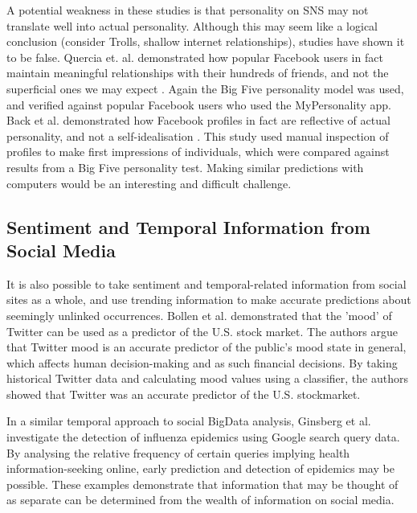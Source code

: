 A potential weakness in these studies is that personality on SNS may not translate well into actual personality. Although this may seem like a logical conclusion (consider Trolls, shallow internet relationships), studies have shown it to be false. Quercia et. al. demonstrated how popular Facebook users in fact maintain meaningful relationships with their hundreds of friends, and not the superficial ones we may expect \cite{quercia2012personality}. Again the Big Five personality model was used, and verified against popular Facebook users who used the MyPersonality app. Back et al. \cite{back2010facebook} demonstrated how Facebook profiles in fact are reflective of actual personality, and not a self-idealisation . This study used manual inspection of profiles to make first impressions of individuals, which were compared against results from a Big Five personality test. Making similar predictions with computers would be an interesting and difficult challenge. 

\subsection{Sentiment and Temporal Information from Social Media}

It is also possible to take sentiment and temporal-related information from social sites as a whole, and use trending information to make accurate predictions about seemingly unlinked occurrences. Bollen et al. \cite{bollen2011twitter} demonstrated that the 'mood' of Twitter can be used as a predictor of the U.S. stock market. The authors argue that Twitter mood is an accurate predictor of the public's mood state in general, which affects human decision-making and as such financial decisions. By taking historical Twitter data and calculating mood values using a classifier, the authors showed that Twitter was an accurate predictor of the U.S. stockmarket.

In a similar temporal approach to social BigData analysis, Ginsberg et al. \cite{ginsberg2008detecting} investigate the detection of influenza epidemics using Google search query data. By analysing the relative frequency of certain queries implying health information-seeking online, early prediction and detection of epidemics may be possible. These examples demonstrate that information that may be thought of as separate can be determined from the wealth of information on social media.


